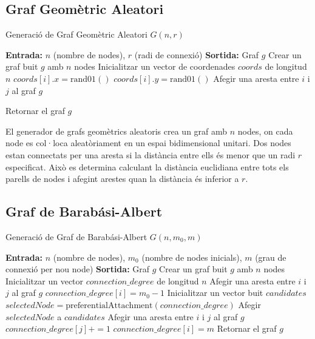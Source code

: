 \documentclass[a4paper]{article}
\begin{document}
	\subsection{Graf Geomètric Aleatori}
	\begin{algorithm} [H]
		\caption{Generació de Graf Geomètric Aleatori $G(n, r)$}
		\begin{algorithmic} [1]
			\Statex \textbf{Entrada:} $n$ (nombre de nodes), $r$ (radi de connexió)
			\Statex \textbf{Sortida:} Graf $g$
			\Statex \vspace{-0.25em}
			\State Crear un graf buit $g$ amb $n$ nodes
			\State Inicialitzar un vector de coordenades $coords$ de longitud $n$
				\State $coords[i].x = \text{rand01}()$
				\State $coords[i].y = \text{rand01}()$
			\EndFor
						\State Afegir una aresta entre $i$ i $j$ al graf $g$
					\EndIf

				\EndFor
			\EndFor
			\State Retornar el graf $g$
		\end{algorithmic}
	\end{algorithm}
	El generador de grafs geomètrics aleatoris crea un graf amb \( n \) nodes, on cada node es col·loca aleatòriament en un espai bidimensional unitari. Dos nodes estan connectats per una aresta si la distància entre ells és menor que un radi \( r \) especificat. Això es determina calculant la distància euclidiana entre tots els parells de nodes i afegint arestes quan la distància és inferior a \( r \).
		
	\subsection{Graf de Barabási-Albert}

	\begin{algorithm} [H]
		\caption{Generació de Graf de Barabási-Albert $G(n, m_0, m)$}
		\begin{algorithmic} [1]
			\Statex \textbf{Entrada:} $n$ (nombre de nodes), $m_0$ (nombre de nodes inicials), $m$ (grau de connexió per nou node)
			\Statex \textbf{Sortida:} Graf $g$
			\Statex \vspace{-0.25em}
			\State Crear un graf buit $g$ amb $n$ nodes
			\State Inicialitzar un vector $connection\_degree$ de longitud $n$
					\State Afegir una aresta entre $i$ i $j$ al graf $g$
				\EndFor
				\State $connection\_degree[i] = m_0 - 1$
			\EndFor
				\State Inicialitzar un vector buit $candidates$
					\State $selectedNode = \text{preferentialAttachment}(connection\_degree)$
						\State Afegir $selectedNode$ a $candidates$
					\EndIf
				\EndWhile
					\State Afegir una aresta entre $i$ i $j$ al graf $g$
					\State $connection\_degree[j] += 1$
				\EndFor
				\State $connection\_degree[i] = m$
			\EndFor
			\State Retornar el graf $g$
		\end{algorithmic}
	\end{algorithm}
	
\end{document}
